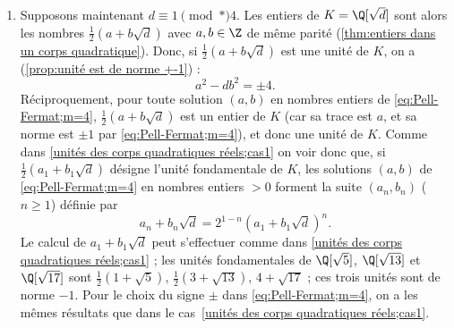 \documentclass[11pt, %
  title in boldface,
  theorem in new line,
  theorem numbering = section,
  number theorems separately,
  simple name,
]{beaulivre}
\begin{document}
\begin{enumerate}
\begin{remark}
        \end{remark}
        \item \label{unités des corps quadratiques réels;cas2} Supposons maintenant \( d \equiv 1 \pmod*{4} \). Les entiers de \( K = \Q[\sqrt{d}] \) sont alors les nombres \( \frac{1}{2}(a+b\sqrt{d}) \) avec \( a,b \in \Z \) de même parité (\cref{thm:entiers dans un corps quadratique}). Donc, si \( \frac{1}{2}(a+b\sqrt{d}) \) est une unité de \( K \), on a (\cref{prop:unité est de norme +-1}) :
        \begin{equation}\label{eq:Pell-Fermat;m=4}
            a^2 - db^2 = \pm 4.
        \end{equation}
        Réciproquement, pour toute solution \( (a,b) \) en nombres entiers de \eqref{eq:Pell-Fermat;m=4}, \( \frac{1}{2}(a+b\sqrt{d}) \) est un entier de \( K \) (car sa trace est \( a \), et sa norme est \( \pm 1 \) par \eqref{eq:Pell-Fermat;m=4}), et donc une unité de \( K \). Comme dans \ref{unités des corps quadratiques réels;cas1} on voir donc que, si \( \frac{1}{2}(a_1+b_1\sqrt{d}) \) désigne l'unité fondamentale de \( K \), les solutions \( (a,b) \) de \eqref{eq:Pell-Fermat;m=4} en nombres entiers \( > 0 \) forment la suite \( (a_n, b_n) \) (\( n \geqslant 1 \)) définie par
        \begin{equation}
            a_n+b_n\sqrt{d} = 2^{1-n} (a_1+b_1\sqrt{d})^n.
        \end{equation}
        Le calcul de \( a_1+b_1\sqrt{d} \) peut s'effectuer comme dans \ref{unités des corps quadratiques réels;cas1} ; les unités fondamentales de \( \Q[\sqrt{5}] \), \( \Q[\sqrt{13}] \) et \( \Q[\sqrt{17}] \) sont \( \frac{1}{2}(1+\sqrt{5}) \), \( \frac{1}{2}(3+\sqrt{13}) \), \( 4+\sqrt{17} \) ; ces trois unités sont de norme \( -1 \). Pour le choix du signe \( \pm \) dans \eqref{eq:Pell-Fermat;m=4}, on a les mêmes résultats que dans le cas~\ref{unités des corps quadratiques réels;cas1}.

\end{enumerate}
\end{document}
